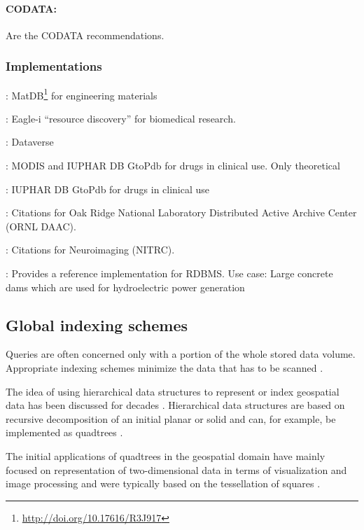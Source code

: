 \documentclass[a4paper,10pt]{article}
\begin{document}
\paragraph{\acrlong{CODATA}:}
\citep{CODATA2013} Are the \gls{CODATA} recommendations.

\subsubsection{Implementations}

\citep{Austin2016}: MatDB\footnote{\url{http://doi.org/10.17616/R3J917}} for engineering materials 

\citep{Alawini2017}: Eagle-i ``resource discovery'' for biomedical research.

\citep{Crosas2011}: Dataverse

\citep{Buneman2016}: \gls{MODIS} and IUPHAR DB GtoPdb for drugs in clinical use. Only theoretical

\citep{Buneman2010}: IUPHAR DB GtoPdb for drugs in clinical use

\citep{Cook2016}: Citations for Oak Ridge National Laboratory Distributed Active Archive Center (ORNL DAAC).

\citep{Honor2016}: Citations for Neuroimaging (NITRC).

\citep{Proll2013}: Provides a reference implementation for \gls{RDBMS}. Use case: Large concrete dams which are used for hydroelectric power generation

\newpage
\subsection{Global indexing schemes}
\label{lit_index}
Queries are often concerned only with a portion of the whole stored data volume.
Appropriate indexing schemes minimize the data that has to be scanned \citep{Kunszt2000}.

The idea of using hierarchical data structures to represent or index geospatial data has been discussed for decades \citep{Dutton1996, Samet1988}.
Hierarchical data structures are based on recursive decomposition of an initial planar or solid and can, for example, be implemented as quadtrees \citep{Samet1988}.

The initial applications of quadtrees in the geospatial domain have mainly focused on representation of two-dimensional data in terms of visualization and image processing and were typically based on the tessellation of squares \citep{Lugo1995}.
\end{document}
